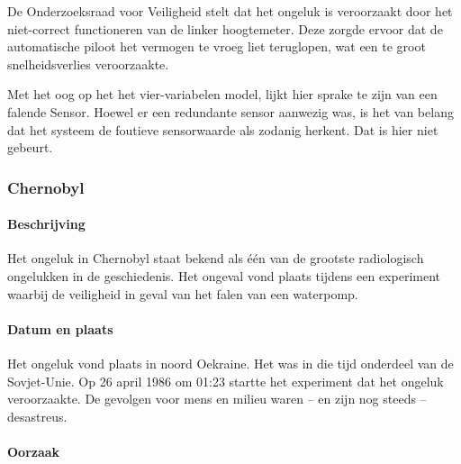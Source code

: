 \documentclass{article}
\begin{document}
\begin{itemize}
			De Onderzoeksraad voor Veiligheid stelt dat het ongeluk is veroorzaakt door het niet-correct functioneren van de linker hoogtemeter. Deze zorgde ervoor dat de automatische piloot het vermogen te vroeg liet teruglopen, wat een te groot snelheidsverlies veroorzaakte.

			Met het oog op het het vier-variabelen model, lijkt hier sprake te zijn van een falende Sensor. Hoewel er een redundante sensor aanwezig was, is het van belang dat het systeem de foutieve sensorwaarde als zodanig herkent. Dat is hier niet gebeurt.

				\end{itemize}
			
			\subsubsection{Chernobyl}

				\paragraph{Beschrijving}

					Het ongeluk in Chernobyl staat bekend als één van de grootste radiologisch ongelukken in de geschiedenis. Het ongeval vond plaats tijdens een experiment waarbij de veiligheid in geval van het falen van een waterpomp. \cite{ragheb2010chernobyl} \par

				\paragraph{Datum en plaats}

					Het ongeluk vond plaats in noord Oekraine. Het was in die tijd onderdeel van de Sovjet-Unie. Op 26 april 1986 om 01:23 startte het experiment dat het ongeluk veroorzaakte. De gevolgen voor mens en milieu waren -- en zijn nog steeds -- desastreus. \cite{BERESFORD201677} \par

				\paragraph{Oorzaak}
\end{document}
